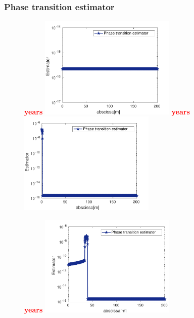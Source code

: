 \documentclass[aspectratio=169]{beamer}
\begin{document}
\begin{frame}
\frametitle{Phase transition estimator}
\begin{figure}
  \begin{overprint}
     \scriptsize{\textcolor{red}{\textbf{ years}}} 
\includegraphics[width=0.58\textwidth]{fig_article_chap_3/MODIF_phase_transition_estimator_appearance_gas_nt=inittime_cv}
\scriptsize{\textcolor{red}{ \textbf{ years}}}
\includegraphics[width=0.58\textwidth]{fig_article_chap_3/MODIF_phase_transition_estimator_appearance_gas_nt=2_cv}
    

\scriptsize{ \textbf{\textcolor{red}{  years}}}
\includegraphics[width=0.58\textwidth]{fig_article_chap_3/MODIF_phase_transition_estimator_appearance_gas_nt=9_cv}
    \end{overprint}
\end{figure}
\end{frame}
\end{document}
